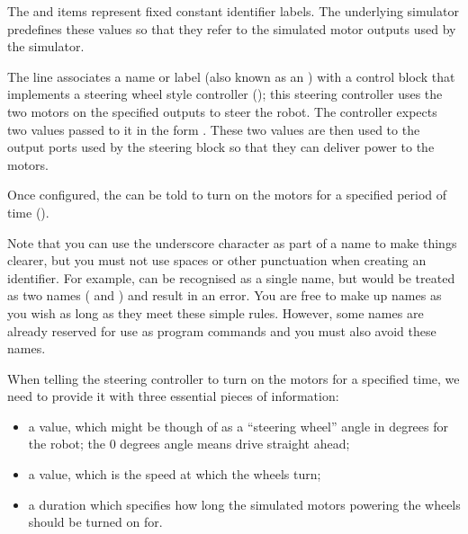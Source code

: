 \documentclass[letterpaper,10pt,english]{sphinxmanual}
\begin{document}
The  and  items represent fixed constant identifier labels. The underlying simulator predefines these values so that they refer to the simulated motor outputs used by the simulator.

The  line associates a  name or label (also known as an ) with a control block that implements a steering wheel style controller (); this steering controller uses the two motors on the specified outputs to steer the robot. The controller expects two values passed to it in the form . These two values are then used to  the output ports used by
the steering block so that they can deliver power to the motors.

Once configured, the  can be told to turn on the motors for a specified period of time ().

Note that you can use the underscore character as part of a name to make things clearer, but you must not use spaces or other punctuation when creating an identifier. For example,  can be recognised as a single name, but  would be treated as two names ( and ) and result in an error. You are free to make up names as you wish as long as they meet these simple rules. However, some names are already reserved for use as program commands and you must also
avoid these names.

When telling the steering controller to turn on the motors for a specified time, we need to provide it with three essential pieces of information:
\begin{itemize}
\item {} 
a  value, which might be though of as a “steering wheel” angle in degrees for the robot; the 0 degrees angle means drive straight ahead;

\item {} 
a  value, which is the speed at which the wheels turn;

\item {} 
a  duration which specifies how long the simulated motors powering the wheels should be turned on for.

\end{itemize}
\end{document}
